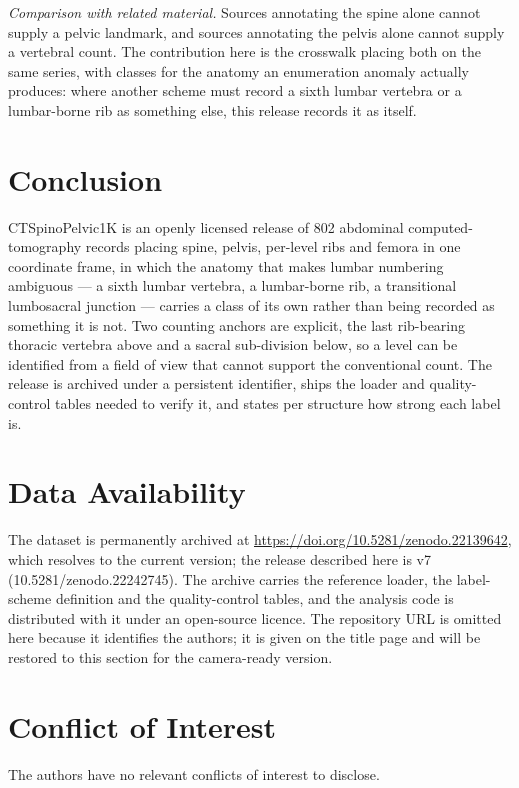 \documentclass[aapm,mph,amsmath,amssymb,reprint,linenumbers]{revtex4-2}
\newcommand{\datasetdoi}{10.5281/zenodo.22139642}
\newcommand{\datasetversiondoi}{10.5281/zenodo.22242745}
\newcommand{\datasetversion}{v7}
\begin{document}
\emph{Comparison with related material.} Sources annotating the spine alone cannot supply a
pelvic landmark, and sources annotating the pelvis alone cannot supply a vertebral count.
The contribution here is the crosswalk placing both on the same series, with classes for the
anatomy an enumeration anomaly actually produces: where another scheme must record a sixth
lumbar vertebra or a lumbar-borne rib as something else, this release records it as itself.

\section{Conclusion}

CTSpinoPelvic1K is an openly licensed release of 802 abdominal computed-tomography records
placing spine, pelvis, per-level ribs and femora in one coordinate frame, in which the
anatomy that makes lumbar numbering ambiguous --- a sixth lumbar vertebra, a lumbar-borne
rib, a transitional lumbosacral junction --- carries a class of its own rather than being
recorded as something it is not. Two counting anchors are explicit, the last rib-bearing
thoracic vertebra above and a sacral sub-division below, so a level can be identified from a
field of view that cannot support the conventional count. The release is archived under a
persistent identifier, ships the loader and quality-control tables needed to verify it, and
states per structure how strong each label is.

\section*{Data Availability}
The dataset is permanently archived at \url{https://doi.org/\datasetdoi}, which resolves to
the current version; the release described here is \datasetversion{} (\datasetversiondoi).
The archive carries the reference loader, the label-scheme definition and the
quality-control tables, and the analysis code is distributed with it under an open-source
licence. The repository URL is omitted here because it identifies the authors; it is given
on the title page and will be restored to this section for the camera-ready version.

\section*{Conflict of Interest}
The authors have no relevant conflicts of interest to disclose.
\end{document}
